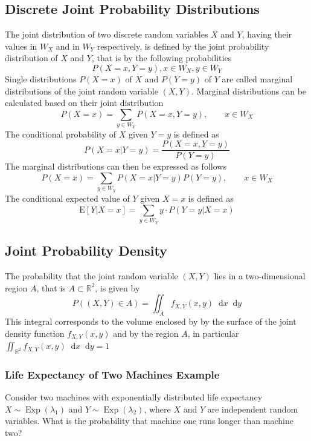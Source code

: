 \documentclass[11pt]{article}
\newcommand*\ev[1]{\mathrel{\text{E}\left[#1\right]}}
\newcommand*\R{\mathbb{R}}
\newcommand*\diff{\mathop{}\!\mathrm{d}}
\newcommand*\Exp[1]{\mathop{\text{Exp}}\left(#1\right)}
\begin{document}
\subsection{Discrete Joint Probability Distributions}
The joint distribution of two discrete random variables $X$ and $Y$, having their values in $W_X$ and in $W_Y$ respectively, is defined by the joint probability distribution of $X$ and $Y$, that is by the following probabilities
\begin{equation*}
	P(X=x, Y=y), x\in W_X, y\in W_Y
\end{equation*}
Single distributions $P(X = x)$ of $X$ and $P(Y = y)$ of $Y$ are called marginal distributions of the joint random variable $(X,Y)$. Marginal distributions can be calculated based on their joint distribution
\begin{equation*}
	P(X=x) = \sum_{y\in W_Y} P(X = x, Y = y),\qquad x\in W_X
\end{equation*}
The conditional probability of $X$ given $Y=y$ is defined as
\begin{equation*}
	P(X = x | Y = y) = \frac{P(X = x, Y = y)}{P(Y=y)}
\end{equation*}
The marginal distributions can then be expressed as follows
\begin{equation*}
	P(X=x) = \sum_{y\in W_y} P(X=x|Y=y)P(Y=y),\qquad x\in W_X
\end{equation*}
The conditional expected value of $Y$ given $X=x$ is defined as
\begin{equation*}
	\ev{Y|X=x} = \sum_{y\in W_Y} y\cdot P(Y=y|X=x)
\end{equation*}

\subsection{Joint Probability Density}
The probability that the joint random variable $(X,Y)$ lies in a two-dimensional region $A$, that is $A\subset \R^2$, is given by
\begin{equation*}
	P\left( (X,Y) \in A \right) = \iint_{A} f_{X,Y}(x,y) \diff x \diff y
\end{equation*}
This integral corresponds to the volume enclosed by by the surface of the joint density function $f_{X,Y}(x,y)$ and by the region $A$, in particular $\iint_{\R^2} f_{X,Y}(x,y) \diff x\diff y = 1$

\subsubsection{Life Expectancy of Two Machines Example}
Consider two machines with exponentially distributed life expectancy $X\sim \Exp{\lambda_1}$ and $Y\sim\Exp{\lambda_2}$, where $X$ and $Y$ are independent random variables. What is the probability that machine one runs longer than machine two?
\end{document}
